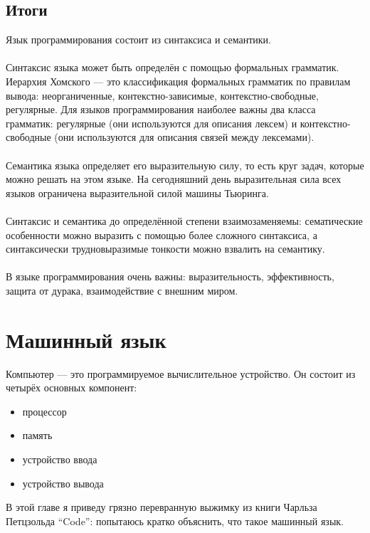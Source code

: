 \documentclass[11pt]{book}
\begin{document}
\section{Итоги}
Язык программирования состоит из синтаксиса и семантики.
\\ \\
Синтаксис языка может быть определён с помощью формальных грамматик.
Иерархия Хомского --- это классификация формальных грамматик по правилам вывода:
неорганиченные, контекстно-зависимые, контекстно-свободные, регулярные.
Для языков программирования наиболее важны два класса грамматик: регулярные (они используются для описания лексем)
и контекстно-свободные (они используются для описания связей между лексемами).
\\ \\
Семантика языка определяет его выразительную силу, то есть круг задач, которые можно решать на этом языке.
На сегодняшний день выразительная сила всех языков ограничена выразительной силой машины Тьюринга.
\\ \\
Синтаксис и семантика до определённой степени взаимозаменяемы:
сематические особенности можно выразить с помощью более сложного синтаксиса,
а синтаксически трудновыразимые тонкости можно взвалить на семантику.
\\ \\
В языке программирования очень важны: выразительность, эффективность, защита от дурака, взаимодействие с внешним миром.



\chapter{Машинный язык}
Компьютер --- это программируемое вычислительное устройство.
Он состоит из четырёх основных компонент:
\begin{itemize}
\item процессор
\item память
\item устройство ввода
\item устройство вывода
\end{itemize}
В этой главе я приведу грязно перевранную выжимку из книги Чарльза Петцзольда ``Code'':
попытаюсь кратко объяснить, что такое машинный язык.
\end{document}

